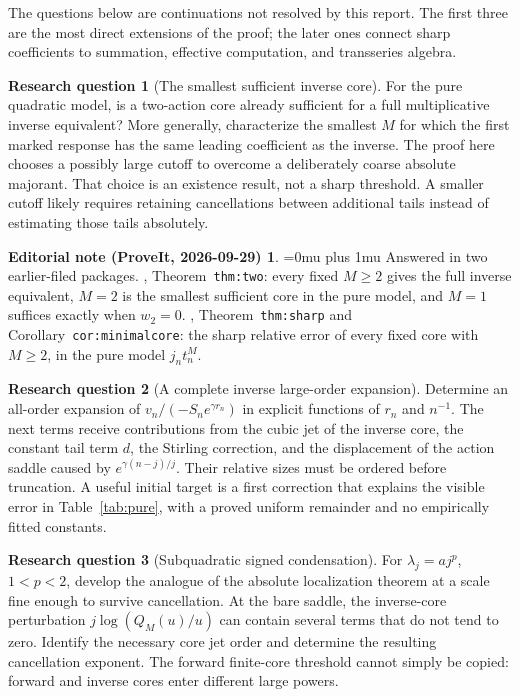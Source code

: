 \documentclass[11pt,a4paper]{article}
\numberwithin{equation}{section}
\theoremstyle{definition}\newtheorem{definition}[theorem]{Definition}
\newtheorem{question}{Research question}
\theoremstyle{remark}\newtheorem{remark}[theorem]{Remark}
\theoremstyle{definition}
\newtheorem*{ednoteinner}{Editorial note (ProveIt, 2026-09-29)}
\newenvironment{ednote}{\begin{ednoteinner}\sloppy\Urlmuskip=0mu plus 1mu\relax}{\end{ednoteinner}}
\begin{document}
The questions below are continuations not resolved by this report. The first
three are the most direct extensions of the proof; the later ones connect
sharp coefficients to summation, effective computation, and transseries
algebra.

\begin{question}[The smallest sufficient inverse core]
For the pure quadratic model, is a two-action core already sufficient for a
full multiplicative inverse equivalent? More generally, characterize the
smallest \(M\) for which the first marked response has the same leading
coefficient as the inverse. The proof here chooses a possibly large cutoff
to overcome a deliberately coarse absolute majorant. That choice is an
existence result, not a sharp threshold. A smaller cutoff likely requires
retaining cancellations between additional tails instead of estimating
those tails absolutely.
\end{question}
\begin{ednote}
Answered in two earlier-filed packages. \cite{ed:sqi},
Theorem~\texttt{thm:two}: every fixed \(M\ge2\) gives the full inverse
equivalent, \(M=2\) is the smallest sufficient core in the pure model, and
\(M=1\) suffices exactly when \(w_2=0\). \cite{ed:qfr},
Theorem~\texttt{thm:sharp} and Corollary~\texttt{cor:minimalcore}: the
sharp relative error of every fixed core with \(M\ge2\), in the pure model
\(j_nt_n^M\).
\end{ednote}

\begin{question}[A complete inverse large-order expansion]
Determine an all-order expansion of \(v_n/(-S_ne^{\gamma r_n})\) in
explicit functions of \(r_n\) and \(n^{-1}\). The next terms receive
contributions from the cubic jet of the inverse core, the constant tail
term \(d\), the Stirling correction, and the displacement of the action
saddle caused by \(e^{\gamma(n-j)/j}\). Their relative sizes must be
ordered before truncation. A useful initial target is a first correction
that explains the visible error in Table~\ref{tab:pure}, with a proved
uniform remainder and no empirically fitted constants.
\end{question}

\begin{question}[Subquadratic signed condensation]
For \(\lambda_j=aj^p\), \(1<p<2\), develop the analogue of the absolute
localization theorem at a scale fine enough to survive cancellation.
At the bare saddle, the inverse-core perturbation \(j\log(Q_M(u)/u)\)
can contain several terms that do not tend to zero. Identify the necessary
core jet order and determine the resulting cancellation exponent. The
forward finite-core threshold cannot simply be copied: forward and inverse
cores enter different large powers.
\end{question}
\end{document}
